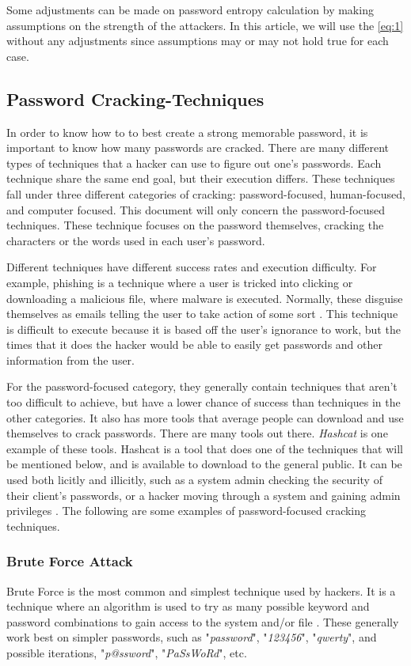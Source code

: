 \documentclass[acmsmall,nonacm]{acmart}
\begin{document}
Some adjustments can be made on password entropy calculation by making assumptions on the strength of the attackers. In this article, we will use the \autoref{eq:1} without any adjustments since assumptions may or may not hold true for each case. 

\subsection{Password Cracking-Techniques} \label{cracking}

In order to know how to to best create a strong memorable password, it is important to know how many passwords are cracked. There are many different types of techniques that a hacker can use to figure out one's passwords. Each technique share the same end goal, but their execution differs. These techniques fall under three different categories of cracking: password-focused, human-focused, and computer focused. This document will only concern the password-focused techniques. These technique focuses on the password themselves, cracking the characters or the words used in each user's password. 

Different techniques have different success rates and execution difficulty. For example, phishing is a technique where a user is tricked into clicking or downloading a malicious file, where malware is executed. Normally, these disguise themselves as emails telling the user to take action of some sort \cite{walker_2020}. This technique is difficult to execute because it is based off the user's ignorance to work, but the times that it does the hacker would be able to easily get passwords and other information from the user. 

\newpage
For the password-focused category, they generally contain techniques that aren't too difficult to achieve, but have a lower chance of success than techniques in the other categories. It also has more tools that average people can download and use themselves to crack passwords. There are many tools out there. \emph{Hashcat} is one example of these tools. Hashcat is a tool that does one of the techniques that will be mentioned below, and is available to download to the general public. It can be used both licitly and illicitly, such as a system admin checking the security of their client's passwords, or a hacker moving through a system and gaining admin privileges \cite{porup_2020}. The following are some examples of password-focused cracking techniques.

\subsubsection{Brute Force Attack}
Brute Force is the most common and simplest technique used by hackers. It is a technique where an algorithm is used to try as many possible keyword and password combinations to gain access to the system and/or file \cite{kaspersky_2021}. These generally work best on simpler passwords, such as "\emph{password}", "\emph{123456}", "\emph{qwerty}", and possible iterations, "\emph{p@ssword}", "\emph{PaSsWoRd}", etc.
\end{document}
